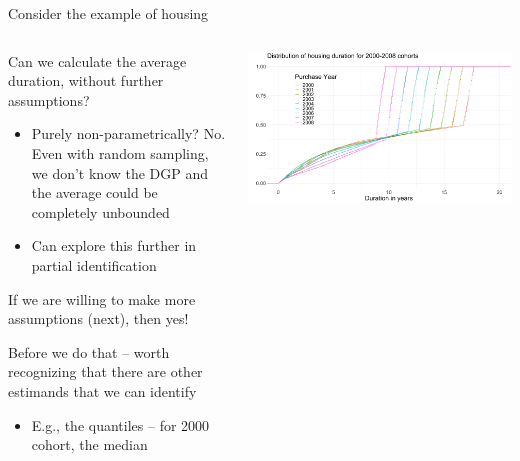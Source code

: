 \documentclass[notes,11pt, aspectratio=169]{beamer}
\newenvironment{wideitemize}{\itemize\addtolength{\itemsep}{10pt}}{\enditemize}
\begin{document}
\begin{frame}{Consider the example of housing}
  \begin{columns}[T] %
    \begin{column}{.5\textwidth}
      \begin{wideitemize}
      \item Can we calculate the average duration, without further assumptions?
        \begin{itemize}
        \item Purely non-parametrically? No. Even with random
          sampling, we don't know the DGP and the average could be
          completely unbounded
        \item Can explore this further in partial identification
        \end{itemize}
      \item If we are willing to make more assumptions (next), then yes!
      \item Before we do that -- worth recognizing that there are
        other estimands that we can identify
        \begin{itemize}
        \item E.g., the quantiles -- for 2000 cohort, the median
        \end{itemize}
      \end{wideitemize}
    \end{column}%
  \hfill%
  \begin{column}{.5\textwidth}
    \includegraphics[width=\linewidth]{images/housing_duration_20002010_byyear_cdf.png}
  \end{column}
\end{columns}
\end{frame}
\end{document}

